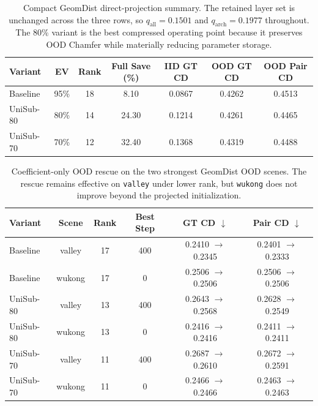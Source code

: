\begin{table}[t]
\centering
\small
\setlength{\tabcolsep}{5pt}
\begin{tabular}{lcccccc}
\hline
Variant & EV & Rank & Full Save (\%) & IID GT CD & OOD GT CD & OOD Pair CD \\
\hline
Baseline & 95\% & 18 & 8.10 & 0.0867 & 0.4262 & 0.4513 \\
UniSub-80 & 80\% & 14 & 24.30 & 0.1214 & 0.4261 & 0.4465 \\
UniSub-70 & 70\% & 12 & 32.40 & 0.1368 & 0.4319 & 0.4488 \\
\hline
\end{tabular}
\caption{Compact GeomDist direct-projection summary. The retained layer set is unchanged across the three rows, so $q_{\mathrm{all}}=0.1501$ and $q_{\mathrm{arch}}=0.1977$ throughout. The 80\% variant is the best compressed operating point because it preserves OOD Chamfer while materially reducing parameter storage.}
\label{tab:geomdist_direct_projection}
\end{table}

\begin{table}[t]
\centering
\small
\setlength{\tabcolsep}{5pt}
\begin{tabular}{lccccc}
\hline
Variant & Scene & Rank & Best Step & GT CD $\downarrow$ & Pair CD $\downarrow$ \\
\hline
Baseline & valley & 17 & 400 & 0.2410 $\rightarrow$ 0.2345 & 0.2401 $\rightarrow$ 0.2333 \\
Baseline & wukong & 17 & 0 & 0.2506 $\rightarrow$ 0.2506 & 0.2506 $\rightarrow$ 0.2506 \\
UniSub-80 & valley & 13 & 400 & 0.2643 $\rightarrow$ 0.2568 & 0.2628 $\rightarrow$ 0.2549 \\
UniSub-80 & wukong & 13 & 0 & 0.2416 $\rightarrow$ 0.2416 & 0.2411 $\rightarrow$ 0.2411 \\
UniSub-70 & valley & 11 & 400 & 0.2687 $\rightarrow$ 0.2610 & 0.2672 $\rightarrow$ 0.2591 \\
UniSub-70 & wukong & 11 & 0 & 0.2466 $\rightarrow$ 0.2466 & 0.2463 $\rightarrow$ 0.2463 \\
\hline
\end{tabular}
\caption{Coefficient-only OOD rescue on the two strongest GeomDist OOD scenes. The rescue remains effective on \texttt{valley} under lower rank, but \texttt{wukong} does not improve beyond the projected initialization.}
\label{tab:geomdist_ood_rescue}
\end{table}
